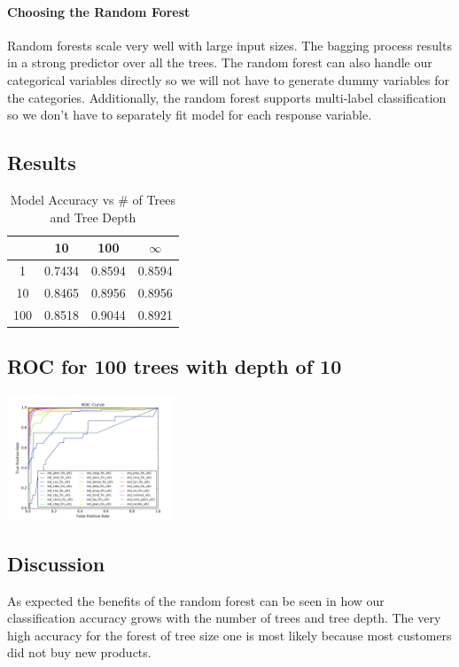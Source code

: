 \documentclass{article}
\begin{document}
\begin{spacing}{1}
\begin{large}
\paragraph{Choosing the Random Forest}

Random forests scale very well with large input sizes. The bagging process results in a strong predictor over all the trees. The random forest can also handle our categorical variables directly so we will not have to generate dummy variables for the categories. Additionally, the random forest supports multi-label classification so we don't have to separately fit model for each response variable.

\subsection{Results}
\begin{table}[H]
	\centering
	\begin{tabular}{|c|c|c|c|}
		\hline
		\backslashbox{Trees}{Depth} & 10 & 100 & $\infty$ \\
		\hline
		1 & 0.7434 & 0.8594  & 0.8594 \\
		10 & 0.8465 & 0.8956  & 0.8956 \\
		100 & 0.8518 & 0.9044  & 0.8921 \\
		\hline
	\end{tabular}
	\caption{Model Accuracy vs \# of Trees and Tree Depth}
	\label{tab:my_label}
\end{table}


\subsection{ROC for 100 trees with depth of 10}
\begin{center}
	\includegraphics[width = 5cm]{ROC.png}
\end{center}

\subsection{Discussion}

As expected the benefits of the random forest can be seen in how our classification accuracy grows with the number of trees and tree depth. The very high accuracy for the forest of tree size one is most likely because most customers did not buy new products.



\end{large}
\end{spacing}
\end{document}
